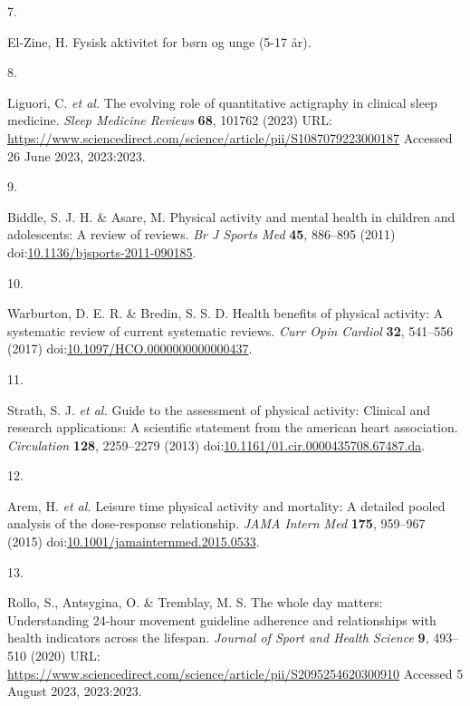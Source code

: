 \documentclass[
  9pt,
]{article}
\newlength{\cslhangindent}
\newlength{\csllabelwidth}
\newlength{\cslentryspacingunit} %
\newenvironment{CSLReferences}[2] %
 {%
  \setlength{\parindent}{0pt}
  \ifodd #1
  \let\oldpar\par
  \def\par{\hangindent=\cslhangindent\oldpar}
  \fi
  \setlength{\parskip}{#2\cslentryspacingunit}
 }%
 {}
\newcommand{\CSLLeftMargin}[1]{\parbox[t]{\csllabelwidth}{#1}}
\newcommand{\CSLRightInline}[1]{\parbox[t]{\linewidth - \csllabelwidth}{#1}\break}
\begin{document}
\begin{CSLReferences}{0}{0}
\leavevmode{}%
\CSLLeftMargin{7. }%
\CSLRightInline{El-Zine, H. Fysisk aktivitet for børn og unge (5-17
år).}

\leavevmode{}%
\CSLLeftMargin{8. }%
\CSLRightInline{Liguori, C. \emph{et al.} The evolving role of
quantitative actigraphy in clinical sleep medicine. \emph{Sleep Medicine
Reviews} \textbf{68}, 101762 (2023) URL:
\url{https://www.sciencedirect.com/science/article/pii/S1087079223000187}
Accessed 26 June 2023, 2023:2023.}

\leavevmode{}%
\CSLLeftMargin{9. }%
\CSLRightInline{Biddle, S. J. H. \& Asare, M. Physical activity and
mental health in children and adolescents: A review of reviews. \emph{Br
J Sports Med} \textbf{45}, 886--895 (2011)
doi:\href{https://doi.org/10.1136/bjsports-2011-090185}{10.1136/bjsports-2011-090185}.}

\leavevmode{}%
\CSLLeftMargin{10. }%
\CSLRightInline{Warburton, D. E. R. \& Bredin, S. S. D. Health benefits
of physical activity: A systematic review of current systematic reviews.
\emph{Curr Opin Cardiol} \textbf{32}, 541--556 (2017)
doi:\href{https://doi.org/10.1097/HCO.0000000000000437}{10.1097/HCO.0000000000000437}.}

\leavevmode{}%
\CSLLeftMargin{11. }%
\CSLRightInline{Strath, S. J. \emph{et al.} Guide to the assessment of
physical activity: Clinical and research applications: A scientific
statement from the american heart association. \emph{Circulation}
\textbf{128}, 2259--2279 (2013)
doi:\href{https://doi.org/10.1161/01.cir.0000435708.67487.da}{10.1161/01.cir.0000435708.67487.da}.}

\leavevmode{}%
\CSLLeftMargin{12. }%
\CSLRightInline{Arem, H. \emph{et al.} Leisure time physical activity
and mortality: A detailed pooled analysis of the dose-response
relationship. \emph{{JAMA} Intern Med} \textbf{175}, 959--967 (2015)
doi:\href{https://doi.org/10.1001/jamainternmed.2015.0533}{10.1001/jamainternmed.2015.0533}.}

\leavevmode{}%
\CSLLeftMargin{13. }%
\CSLRightInline{Rollo, S., Antsygina, O. \& Tremblay, M. S. The whole
day matters: Understanding 24-hour movement guideline adherence and
relationships with health indicators across the lifespan. \emph{Journal
of Sport and Health Science} \textbf{9}, 493--510 (2020) URL:
\url{https://www.sciencedirect.com/science/article/pii/S2095254620300910}
Accessed 5 August 2023, 2023:2023.}


\end{CSLReferences}
\end{document}
